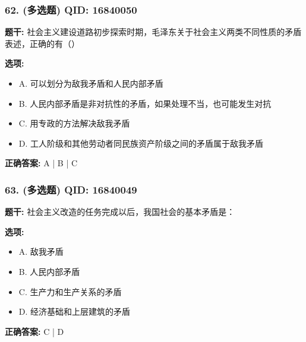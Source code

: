 \documentclass[12pt,UTF8]{ctexart}
\begin{document}
\vspace{0.3em}\hrulefill\vspace{0.7em}

\subsubsection*{62. (多选题) \small QID: 16840050}

\textbf{题干:}
社会主义建设道路初步探索时期，毛泽东关于社会主义两类不同性质的矛盾表述，正确的有（）

\textbf{选项:}
\begin{itemize}[leftmargin=*]

  \item A. 可以划分为敌我矛盾和人民内部矛盾

  \item B. 人民内部矛盾是非对抗性的矛盾，如果处理不当，也可能发生对抗

  \item C. 用专政的方法解决敌我矛盾

  \item D. 工人阶级和其他劳动者同民族资产阶级之间的矛盾属于敌我矛盾

\end{itemize}

\textbf{正确答案:}
A | B | C

\vspace{0.3em}\hrulefill\vspace{0.7em}

\subsubsection*{63. (多选题) \small QID: 16840049}

\textbf{题干:}
社会主义改造的任务完成以后，我国社会的基本矛盾是：

\textbf{选项:}
\begin{itemize}[leftmargin=*]

  \item A. 敌我矛盾

  \item B. 人民内部矛盾

  \item C. 生产力和生产关系的矛盾

  \item D. 经济基础和上层建筑的矛盾

\end{itemize}

\textbf{正确答案:}
C | D
\end{document}
